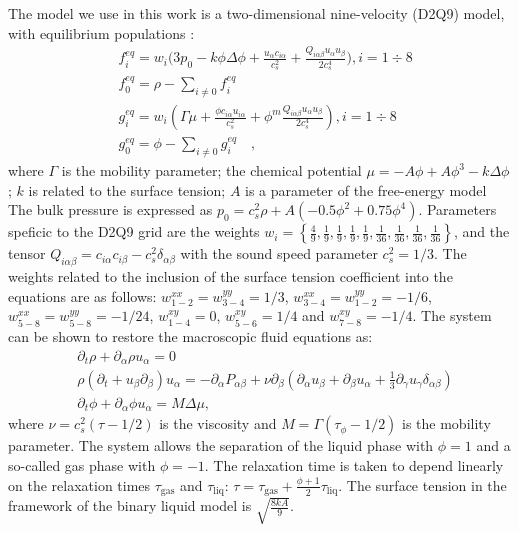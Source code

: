 \documentclass{article}
\begin{document}
The model we use in this work is a two-dimensional nine-velocity (D2Q9) model,
with equilibrium populations \cite{pooley-contact}:
\begin{equation}
\begin{aligned}
&f_i^{eq}=w_i 
\biggl(3
p_0 - k \phi \Delta \phi
+\frac{u_{\alpha}c_{i\alpha}}{c_s^2}+\frac{Q_{i\alpha\beta}u_{\alpha } u_ {
\beta}}{2 c_s^4}\biggr), i=1\div8\\
&f_0^{eq}=\rho-\sum_{i\neq0}{f_i^{eq}}\\
&g_i^{eq}=w_i\left(\Gamma \mu + \frac{\phi c_{i\alpha} u_{i\alpha}}{c_s^2}+\phi^m
\frac{Q_{i\alpha\beta}u_{\alpha}u_{\beta}}{2 c_s^4}\right), i=1\div8 \\
&g_0^{eq}=\phi-\sum_{i\neq0}{g_i^{eq}}\quad,
\end{aligned}
\end{equation}
where $\Gamma$ is the mobility parameter; the chemical potential
$\mu=-A\phi+A\phi^3-k\Delta\phi$; $k$ is related to the surface
tension; $A$ is a parameter of the free-energy model  The bulk pressure
is expressed as $p_0=c_s^2 \rho +A (-0.5 \phi^2+0.75 \phi^4)$. 
Parameters speficic to the D2Q9 grid are the weights
$w_i=\left\{\frac{4}{9},\frac{1}{9},\frac{1}{9},\frac{1}{9},\frac{1}{9},
\frac{1}{36},\frac{1}{36},\frac{1}{36},\frac{1}{36}\right\}$, and the tensor
$Q_{i\alpha\beta}=c_{i\alpha} c_{i\beta} - c_s^2 \delta_{\alpha\beta}$ with
the sound speed parameter $c_s^2=1/3$.  The weights related to the
inclusion of the surface tension coefficient into the equations are as follows:
$w^{xx}_{1-2}=w^{yy}_{3-4}=1/3$, $w^{xx}_{3-4}=w^{yy}_{1-2}=-1/6$,
$w^{xx}_{5-8}=w^{yy}_{5-8}=-1/24$, $w^{xy}_{1-4}=0$, $w^{xy}_{5-6}=1/4$ and
$w^{xy}_{7-8}=-1/4$. The system can be shown to restore the macroscopic
fluid equations as:
\begin{equation}
\begin{aligned}
&\partial_t \rho+ \partial_{\alpha} \rho u_{\alpha}=0\\
&\rho\left(\partial_t+u_{\beta}\partial_{\beta}\right) u_{\alpha}=
-\partial_{\alpha}P_{\alpha \beta} +
\nu\partial_{\beta}\left(\partial_{\alpha}u_{\beta}+\partial_{\beta} u_{\alpha}
+ \frac{1}{3}\partial_{\gamma} u_{\gamma} \delta_{\alpha\beta}\right)\\
&\partial_t \phi + \partial_{\alpha} \phi u_{\alpha}=M \Delta \mu,
\end{aligned}
\label{binary:fluid:system}
\end{equation}
where $\nu=c_s^2 (\tau-1/2)$ is the viscosity and
$M=\Gamma(\tau_{\phi}-1/2)$ is the mobility parameter. The system allows the separation of the liquid
phase with $\phi=1$ and a so-called gas phase with $\phi=-1$. The
relaxation time is taken to depend linearly on the relaxation
times $\tau_{\mathrm{gas}}$ and $\tau_{\mathrm{liq}}$:
$\tau=\tau_{\mathrm{gas}}+\frac{\phi+1}{2}\tau_{\mathrm{liq}}$.
The surface tension in the framework of the binary liquid model is $\sqrt{\frac{8 k A}{9}}$.
\end{document}
